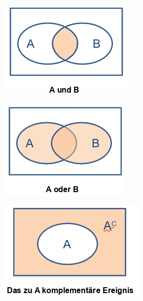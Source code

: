 \documentclass[11pt,twoside,landscape]{article}
\begin{document}
\begin{multicols}{3}
\begin{center}
\includegraphics[width=.9\linewidth]{img/w06-wahrscheinlichkeit-and.png}
\end{center}
\begin{center}
\includegraphics[width=.9\linewidth]{img/w06-wahrscheinlichkeit-or.png}
\end{center}
\begin{center}
\includegraphics[width=.9\linewidth]{img/w06-wahrscheinlichkeit-not.png}

\end{center}
\end{multicols}
\end{document}
